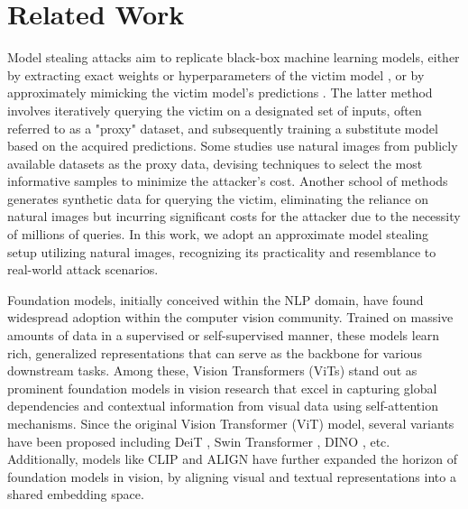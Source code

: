 
\section{Related Work}

%
Model stealing attacks aim to replicate black-box machine learning models, either by extracting exact weights or hyperparameters of the victim model \cite{milli2019model,jagielski2020high,carlini2020cryptanalytic,batina2018csi,hua2018reverse,duddu2018stealing}, or by approximately mimicking the victim model's predictions  \cite{batina2018csi,hua2018reverse,duddu2018stealing}. 
The latter method involves iteratively querying the victim on a designated set of inputs, often referred to as a "proxy" dataset, and subsequently training a substitute model based on the acquired predictions.
Some studies \cite{correia2018copycat,orekondy2019knockoff,pal2020activethief,wang2021black} use natural images from publicly available datasets as the proxy data, devising techniques to select the most informative samples to minimize the attacker's cost. Another school of methods \cite{zhou2020dast, kariyappa2021maze, truong2021data, wang2021delving,sanyal2022towards,Beetham2023} generates synthetic data for querying the victim, eliminating the reliance on natural images but incurring significant costs for the attacker due to the necessity of millions of queries. In this work, we adopt an approximate model stealing setup utilizing natural images, recognizing its practicality and resemblance to real-world attack scenarios.

%
Foundation models, initially conceived within the NLP domain, have found widespread adoption within the computer vision community. Trained on massive amounts of data in a supervised or self-supervised manner, these models learn rich, generalized representations that can serve as the backbone for various downstream tasks. Among these, Vision Transformers (ViTs) \cite{dosovitskiy2020image} stand out as prominent foundation models in vision research that excel in capturing global dependencies and contextual information from visual data using self-attention mechanisms. 
Since the original Vision Transformer (ViT) \cite{dosovitskiy2020image} model, several variants have been proposed including DeiT \cite{touvron2021training}, Swin Transformer \cite{liu2021swin}, DINO \cite{caron2021emerging}, etc. 
%
Additionally, models like CLIP \cite{radford2021learning} and ALIGN \cite{jia2021scaling} have further expanded the horizon of foundation models in vision, by aligning visual and textual representations into a shared embedding space. 

